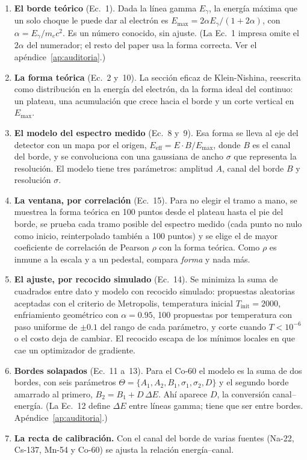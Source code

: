 \documentclass[11pt,a4paper]{article}
\begin{document}
\begin{enumerate}
\item \textbf{El borde teórico} (Ec.~1). Dada la línea gamma $E_\gamma$, la
      energía máxima que un solo choque le puede dar al electrón es
      $E_{\max} = 2\alpha E_\gamma/(1+2\alpha)$, con
      $\alpha = E_\gamma/m_ec^2$. Es un número conocido, sin ajuste. (La
      Ec.~1 impresa omite el $2\alpha$ del numerador; el resto del paper usa
      la forma correcta. Ver el apéndice~\ref{ap:auditoria}.)
\item \textbf{La forma teórica} (Ec.~2 y~10). La sección eficaz de
      Klein-Nishina, reescrita como distribución en la energía del electrón,
      da la forma ideal del continuo: un plateau, una acumulación que crece
      hacia el borde y un corte vertical en $E_{\max}$.
\item \textbf{El modelo del espectro medido} (Ec.~8 y~9). Esa forma se lleva
      al eje del detector con un mapa por el origen,
      $E_{\text{eff}} = E\cdot B/E_{\max}$, donde $B$ es el canal del borde, y
      se convoluciona con una gaussiana de ancho $\sigma$ que representa la
      resolución. El modelo tiene tres parámetros: amplitud $A$, canal del
      borde $B$ y resolución $\sigma$.
\item \textbf{La ventana, por correlación} (Ec.~15). Para no elegir el tramo
      a mano, se muestrea la forma teórica en 100 puntos desde el plateau
      hasta el pie del borde, se prueba cada tramo posible del espectro medido
      (cada punto no nulo como inicio, reinterpolado también a 100 puntos) y
      se elige el de mayor coeficiente de correlación de Pearson $\rho$ con la
      forma teórica. Como $\rho$ es inmune a la escala y a un pedestal,
      compara \emph{forma} y nada más.
\item \textbf{El ajuste, por recocido simulado} (Ec.~14). Se minimiza la suma
      de cuadrados entre dato y modelo con recocido simulado: propuestas
      aleatorias aceptadas con el criterio de Metropolis, temperatura inicial
      $T_{\text{init}} = 2000$, enfriamiento geométrico con $\alpha = 0.95$,
      100 propuestas por temperatura con paso uniforme de $\pm0.1$ del rango
      de cada parámetro, y corte cuando $T < 10^{-6}$ o el costo deja de
      cambiar. El recocido escapa de los mínimos locales en que cae un
      optimizador de gradiente.
\item \textbf{Bordes solapados} (Ec.~11 a~13). Para el Co-60 el modelo es la
      suma de dos bordes, con seis parámetros
      $\Theta = \{A_1, A_2, B_1, \sigma_1, \sigma_2, D\}$ y el segundo borde
      amarrado al primero, $B_2 = B_1 + D\,\Delta E$. Ahí aparece $D$, la
      conversión canal--energía. (La Ec.~12 define $\Delta E$ entre líneas
      gamma; tiene que ser entre bordes. Apéndice~\ref{ap:auditoria}.)
\item \textbf{La recta de calibración.} Con el canal del borde de varias
      fuentes (Na-22, Cs-137, Mn-54 y Co-60) se ajusta la relación
      energía--canal.
\end{enumerate}
\end{document}
